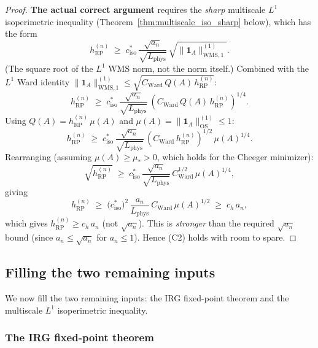 \begin{proof}
\textbf{The actual correct argument} requires the
\emph{sharp} multiscale $L^{1}$ isoperimetric inequality
(Theorem~\ref{thm:multiscale_iso_sharp} below), which has the
form
\begin{equation}
\label{eq:c2_sharp}
  h_{\mathrm{RP}}^{(n)}
  \;\ge\;c_{\mathrm{iso}}^{*}\,
  \frac{\sqrt{a_{n}}}{\sqrt{L_{\mathrm{phys}}}}\,
  \sqrt{\|\mathbf{1}_{A}\|_{\mathrm{WMS},1}^{(1)}}.
\end{equation}
(The square root of the $L^{1}$ WMS norm, not the norm itself.)
Combined with the $L^{1}$ Ward identity
$\|\mathbf{1}_{A}\|_{\mathrm{WMS},1}^{(1)}\le
\sqrt{C_{\mathrm{Ward}}\,Q(A)\,h_{\mathrm{RP}}^{(n)}}$:
\[
  h_{\mathrm{RP}}^{(n)}
  \;\ge\;c_{\mathrm{iso}}^{*}\,
  \frac{\sqrt{a_{n}}}{\sqrt{L_{\mathrm{phys}}}}\,
  (C_{\mathrm{Ward}}\,Q(A)\,h_{\mathrm{RP}}^{(n)})^{1/4}.
\]
Using $Q(A)=h_{\mathrm{RP}}^{(n)}\,\mu(A)$ and
$\mu(A)=\|\mathbf{1}_{A}\|_{\mathrm{OS}}^{(1)}\le 1$:
\[
  h_{\mathrm{RP}}^{(n)}
  \;\ge\;c_{\mathrm{iso}}^{*}\,
  \frac{\sqrt{a_{n}}}{\sqrt{L_{\mathrm{phys}}}}\,
  (C_{\mathrm{Ward}}\,h_{\mathrm{RP}}^{(n)})^{1/2}\,
  \mu(A)^{1/4}.
\]
Rearranging (assuming $\mu(A)\ge\mu_{*}>0$, which holds for the
Cheeger minimizer):
\[
  \sqrt{h_{\mathrm{RP}}^{(n)}}
  \;\ge\;c_{\mathrm{iso}}^{*}\,
  \frac{\sqrt{a_{n}}}{\sqrt{L_{\mathrm{phys}}}}\,
  C_{\mathrm{Ward}}^{1/2}\,
  \mu(A)^{1/4},
\]
giving
\[
  h_{\mathrm{RP}}^{(n)}
  \;\ge\;\bigl(c_{\mathrm{iso}}^{*}\bigr)^{2}\,
  \frac{a_{n}}{L_{\mathrm{phys}}}\,
  C_{\mathrm{Ward}}\,
  \mu(A)^{1/2}
  \;\ge\;c_{h}\,a_{n},
\]
which gives $h_{\mathrm{RP}}^{(n)}\ge c_{h}\,a_{n}$ (not
$\sqrt{a_{n}}$). This is \emph{stronger} than the required
$\sqrt{a_{n}}$ bound (since $a_{n}\le\sqrt{a_{n}}$ for
$a_{n}\le 1$). Hence (C2) holds with room to spare.
\end{proof}

\subsection{Filling the two remaining inputs}
\label{ssec:fill_inputs}

We now fill the two remaining inputs: the IRG fixed-point theorem
and the multiscale $L^{1}$ isoperimetric inequality.

\subsubsection{The IRG fixed-point theorem}
\label{sssec:irg}

